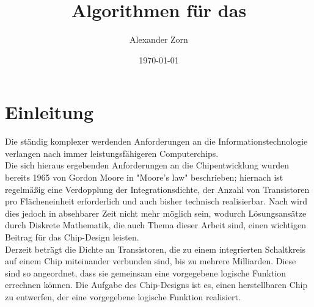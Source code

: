 \documentclass[11pt, a4paper, german]{article}
\author{Alexander Zorn}
\date{\today}
\title{Algorithmen f\"ur das \TM}
\begin{document}
\setlength{\parindent}{0pt} %
\renewcommand{\proofname}{Beweis:}
\maketitle

\setcounter{tocdepth}{2}
\tableofcontents
\newpage 
\section{Einleitung}
\label{sec:einleitung}
Die ständig komplexer werdenden Anforderungen an die Informationstechnologie verlangen nach immer leistungsfähigeren Computerchips. \\
Die sich hieraus ergebenden Anforderungen an die Chipentwicklung wurden bereits 1965 von Gordon Moore in "Moore's law"  \cite{Moore} beschrieben; hiernach ist regelmäßig eine Verdopplung der Integrationsdichte, der Anzahl von Transistoren pro Flächeneinheit erforderlich und auch bisher technisch realisierbar. Nach \cite{Khan} wird dies jedoch in absehbarer Zeit nicht mehr möglich sein, wodurch Lösungsansätze durch Diskrete Mathematik, die auch Thema dieser Arbeit sind, einen wichtigen Beitrag für das Chip-Design leisten. \\
Derzeit beträgt die Dichte an Transistoren, die zu einem integrierten Schaltkreis auf einem Chip miteinander verbunden sind, bis zu mehrere Milliarden. Diese sind so angeordnet, dass sie gemeinsam eine vorgegebene logische Funktion errechnen können. Die Aufgabe des Chip-Designs ist es, einen herstellbaren Chip zu entwerfen, der eine vorgegebene logische Funktion realisiert.\\
\end{document}
